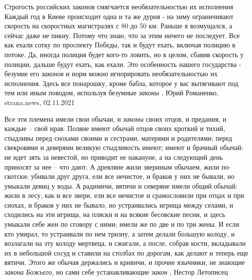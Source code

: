 Строгость российских законов смягчается необязательностью их исполнения
Каждый год в Киеве происходит одна и та же дурня - на зиму ограничивают
скорость на скоростных магистралях с 80 до 50 км. Раньше я возмущался, а сейчас
даже не пикну. Потому что знаю, что за этим ничего не последует. Все как ехали
сотку по проспекту Победы, так и будут ехать, включая полицию в потоке. Да,
иногда полиция будет кого-то ловить, но в целом, сбавив скорость у полиции,
дальше будут ехать, как ехали.  Это особенность нашего государства - безумие
его \emph{законов} и норм можно игнорировать необязательностью их исполнения.
Здесь все понарошку, кроме бабла, которое у вас вытягивают под тем или иным
поводом, используя безумные \emph{законы}
, 
Юрий Романенко, strana.news, 02.11.2021

Все эти племена имели свои обычаи, и \emph{законы} своих отцов, и предания, и каждые –
свой нрав. Поляне имеют обычай отцов своих кроткий и тихий, стыдливы перед
снохами своими и сестрами, матерями и родителями; перед свекровями и деверями
великую стыдливость имеют; имеют и брачный обычай: не идет зять за невестой, но
приводит ее накануне, а на следующий день приносят за нее – что дают. А
древляне жили звериным обычаем, жили по-скотски: убивали друг друга, ели все
нечистое, и браков у них не бывали, но умыкали девиц у воды. А радимичи, вятичи
и северяне имели общий обычай: жили в лесу, как и все звери, ели все нечистое и
срамословили при отцах и при снохах, и браков у них не бывало, но устраивались
игрища между селами, и сходились на эти игрища, на пляски и на всякие бесовские
песни, и здесь умыкали себе жен по сговору с ними; имели же по две и по три
жены. И если кто умирал, то устраивали по нем тризну, а затем делали большую
колоду, и возлагали на эту колоду мертвеца, и сжигали, а после, собрав кости,
вкладывали их в небольшой сосуд и ставили на столбах по дорогам, как делают и
теперь еще вятичи. Этого же обычая держались и кривичи, и прочие язычники, не
знающие \emph{закона Божьего}, но сами себе устанавливающие \emph{закон}
, Нестор Летописец

